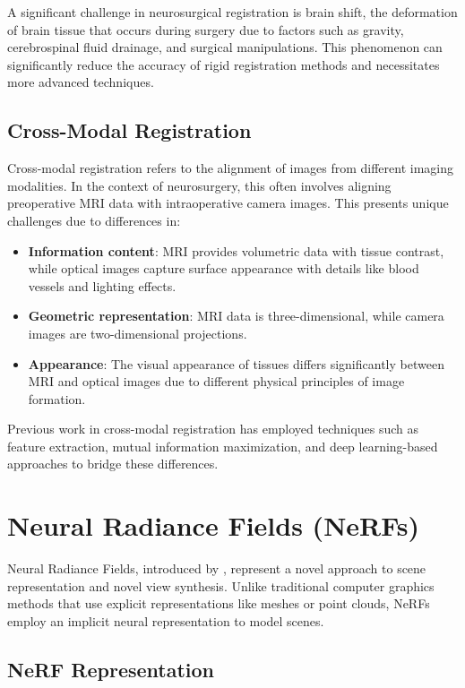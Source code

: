 A significant challenge in neurosurgical registration is brain shift, the deformation of brain tissue that occurs during surgery due to factors such as gravity, cerebrospinal fluid drainage, and surgical manipulations. This phenomenon can significantly reduce the accuracy of rigid registration methods and necessitates more advanced techniques.

\subsection{Cross-Modal Registration}

Cross-modal registration refers to the alignment of images from different imaging modalities. In the context of neurosurgery, this often involves aligning preoperative MRI data with intraoperative camera images. This presents unique challenges due to differences in:

\begin{itemize}
    \item \textbf{Information content}: MRI provides volumetric data with tissue contrast, while optical images capture surface appearance with details like blood vessels and lighting effects.
    \item \textbf{Geometric representation}: MRI data is three-dimensional, while camera images are two-dimensional projections.
    \item \textbf{Appearance}: The visual appearance of tissues differs significantly between MRI and optical images due to different physical principles of image formation.
\end{itemize}

Previous work in cross-modal registration has employed techniques such as feature extraction, mutual information maximization, and deep learning-based approaches to bridge these differences.

\section{Neural Radiance Fields (NeRFs)}

Neural Radiance Fields, introduced by \textcite{mildenhall2020nerf}, represent a novel approach to scene representation and novel view synthesis. Unlike traditional computer graphics methods that use explicit representations like meshes or point clouds, NeRFs employ an implicit neural representation to model scenes.

\subsection{NeRF Representation}

